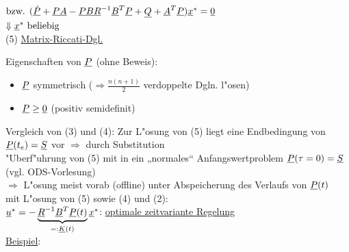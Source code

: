 \documentclass[openany,a4paper,11pt]{book}
\begin{document}
\begin{enumerate}
\begin{center}
    $\text{bzw. } (\uline{\dot{P}}+\uline{PA}-\uline{PBR}^{-1}\uline{B}^T\uline{P}+\uline{Q}+\uline{A}^T\uline{P})\uline{x}^*=\uline{0}$\\
    $\Downarrow \uline{x}^* \text{ beliebig}$\\        
      \quad (5)  \uline{Matrix-Riccati-Dgl.}
    \end{center}
    Eigenschaften von $\uline{P}$ (ohne Beweis):\begin{itemize}
        \item $\uline{P}$ symmetrisch ($\Rightarrow \frac{n(n+1)}{2}$ verdoppelte Dgln. l"osen)
        \item $\uline{P}\ge \uline{0}$ (positiv semidefinit)
    \end{itemize}
    Vergleich von (3) und (4): Zur L"osung von (5) liegt eine Endbedingung von $\uline{P}(t_e)=\uline{S}$ vor $\Rightarrow$ durch Substitution \\
    "Uberf"uhrung von (5) mit  in ein „normales“ Anfangswertproblem $\uline{P}(\tau=0)=\uline{S}$ (vgl. ODS-Vorlesung)\\
    $\Rightarrow$ L"osung meist vorab (offline) unter Abspeicherung des Verlaufs von $\uline{P}(t)$\\
    mit L"osung von (5) sowie (4) und (2):\\
    $\uline{u}^*=-\underbrace{\uline{R}^{-1}\uline{B}^T\uline{P}(t)}_{=:\uline{K}(t)}\uline{x}^*$: \quad {} \quad \uline{optimale zeitvariante Regelung}\\
    \uline{Beispiel}: 
\end{enumerate}
\end{document}
